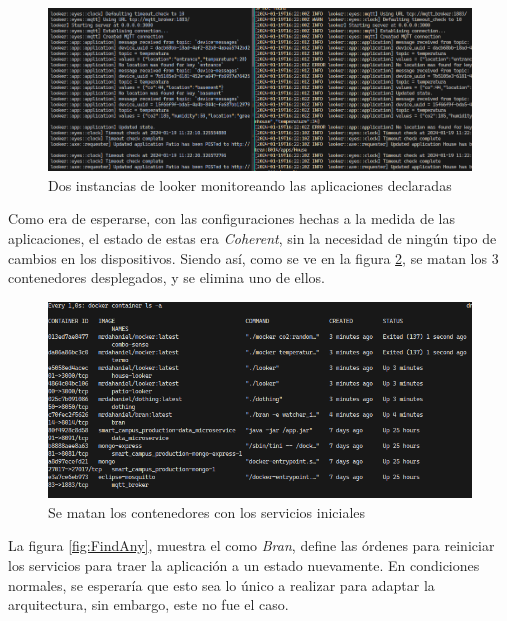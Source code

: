 \begin{figure}[ht]
    \centering
    \caption{Dos instancias de looker monitoreando las aplicaciones declaradas}
    \label{fig:Looker2Apps}
    \includegraphics[width=\linewidth]{images/Looker2Apps.png}
    \vspace{-4mm}
\end{figure}

Como era de esperarse, con las configuraciones hechas a la medida de las aplicaciones, el estado de estas era \textit{Coherent}, sin la necesidad de ningún tipo de cambios en los dispositivos. Siendo así, como se ve en la figura \ref{fig:KillThemAll}, se matan los 3 contenedores desplegados, y se elimina uno de ellos.

\begin{figure}[ht]
    \centering
    \caption{Se matan los contenedores con los servicios iniciales}
    \label{fig:KillThemAll}
    \includegraphics[width=\linewidth]{images/Killing.png}
    \vspace{-4mm}
\end{figure}

La figura \ref{fig:FindAny}, muestra el como \textit{Bran}, define las órdenes para reiniciar los servicios para traer la aplicación a un estado nuevamente. En condiciones normales, se esperaría que esto sea lo único a realizar para adaptar la arquitectura, sin embargo, este no fue el caso.

